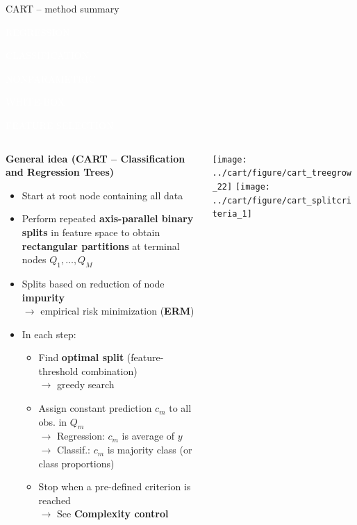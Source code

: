 \documentclass[11pt,compress,t,notes=noshow, xcolor=table]{beamer}
\newcommand{\highlight}[1]{\textcolor{hlcol}{\textbf{#1}}}
\newcommand{\maketag}[2][100]{
  \colorbox{hlcol!#1}{\textcolor{white}{\MakeUppercase{\scriptsize #2}} 
  \vphantom{}}
}
\begin{document}
\begin{vbframe}{CART -- method summary}
  \footnotesize

\maketag{regression} \maketag{classification}
\maketag{Nonparametric} \maketag{White-box} \maketag{Feature selection}

\medskip

\begin{columns}[T, totalwidth=\textwidth]
\begin{column}{0.6\textwidth}
\highlight{General idea (CART -- Classification and Regression Trees)}
\begin{itemize}
  \item Start at root node containing all data
  \item Perform repeated \textbf{axis-parallel binary splits} in feature space to obtain
  \textbf{rectangular partitions} at terminal nodes $Q_1, \dots, Q_M$
  \item Splits based on reduction of node \textbf{impurity} \\
  $\rightarrow$ empirical risk minimization (\textbf{ERM})
  \item In each step:
  \begin{itemize}
    \item Find \textbf{optimal split} (feature-threshold combination) \\
    $\rightarrow$ greedy search
    \item Assign constant prediction $c_m$ to all obs. in $Q_m$\\
    $\rightarrow$ Regression: $c_m$ is average of $y$ \\
    $\rightarrow$ Classif.: $c_m$ is majority class (or class proportions)
    
  \item Stop when a pre-defined criterion is reached\\
  $\rightarrow$ See \highlight{Complexity control}
  \end{itemize}
\end{itemize}

\end{column}
\begin{column}{0.45\textwidth}
\texttt{[image: ../cart/figure/cart\_treegrow\_22]}
\texttt{[image:    ../cart/figure/cart\_splitcriteria\_1]} 
\end{column}
\end{columns}


\end{vbframe}
\end{document}
